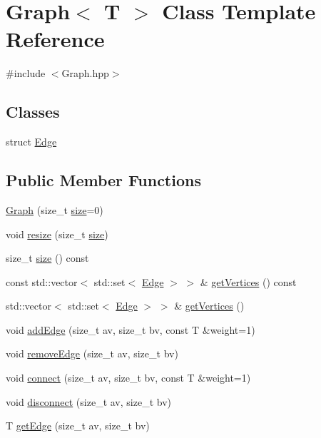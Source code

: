 \hypertarget{class_graph}{}\section{Graph$<$ T $>$ Class Template Reference}
\label{class_graph}


{\ttfamily \#include $<$Graph.\+hpp$>$}

\subsection*{Classes}
\begin{DoxyCompactItemize}
\item 
struct \hyperlink{struct_graph_1_1_edge}{Edge}
\end{DoxyCompactItemize}
\subsection*{Public Member Functions}
\begin{DoxyCompactItemize}
\item 
\hyperlink{class_graph_ae4d33378f071400af20f374d03a2ae17}{Graph} (size\+\_\+t \hyperlink{class_graph_a27cef878a072784aeca6dc1863b39ecb}{size}=0)
\item 
void \hyperlink{class_graph_a2097e3c0a42566a047e922c21ee1bb73}{resize} (size\+\_\+t \hyperlink{class_graph_a27cef878a072784aeca6dc1863b39ecb}{size})
\item 
size\+\_\+t \hyperlink{class_graph_a27cef878a072784aeca6dc1863b39ecb}{size} () const
\item 
const std\+::vector$<$ std\+::set$<$ \hyperlink{struct_graph_1_1_edge}{Edge} $>$ $>$ \& \hyperlink{class_graph_ab37935cf08ce2cafd2edac3a503010f4}{get\+Vertices} () const
\item 
std\+::vector$<$ std\+::set$<$ \hyperlink{struct_graph_1_1_edge}{Edge} $>$ $>$ \& \hyperlink{class_graph_ab7c3b45b65d2b72ced442ff01c81da60}{get\+Vertices} ()
\item 
void \hyperlink{class_graph_a8c2e51b9add82f2faa9979b24702832b}{add\+Edge} (size\+\_\+t av, size\+\_\+t bv, const T \&weight=1)
\item 
void \hyperlink{class_graph_a6f4d3afb61d592c0d7be5a347e1cffbf}{remove\+Edge} (size\+\_\+t av, size\+\_\+t bv)
\item 
void \hyperlink{class_graph_aa029e4ed309862a13ddd3245940c57dd}{connect} (size\+\_\+t av, size\+\_\+t bv, const T \&weight=1)
\item 
void \hyperlink{class_graph_a882821ef2e0e398961b776dcc1a107c2}{disconnect} (size\+\_\+t av, size\+\_\+t bv)
\item 
T \hyperlink{class_graph_a41082f5f83e15b045539d00408d03710}{get\+Edge} (size\+\_\+t av, size\+\_\+t bv)
\end{DoxyCompactItemize}
